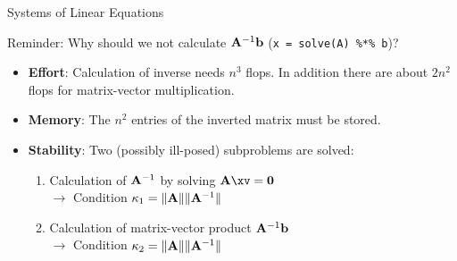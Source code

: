 \begin{vbframe}{Systems of Linear Equations}







\framebreak

Reminder: Why should we not calculate $\mathbf{A}^{-1} \mathbf{b}$ (\texttt{x = solve(A) \%*\% b})?

\begin{itemize}
\item \textbf{Effort}: Calculation of inverse needs $n^3$ flops. In addition there are about $2n^2$ flops for matrix-vector multiplication.
\item \textbf{Memory}: The $n^2$ entries of the inverted matrix must be stored.

\item \textbf{Stability}: Two (possibly ill-posed) subproblems are solved: 
  \begin{enumerate}
  \item Calculation of $\mathbf{A}^{-1}$ by solving $\Amat \xv = \mathbf{0}$ \\
  $\to$ Condition $\kappa_1 = \|\mathbf{A}\|\|\mathbf{A}^{-1}\|$
  \item Calculation of matrix-vector product $\mathbf{A}^{-1}\mathbf{b}$\\
  $\to$ Condition $\kappa_2 = \|\mathbf{A}\|\|\mathbf{A}^{-1}\|$
  \end{enumerate}


\end{itemize}
\end{vbframe}
